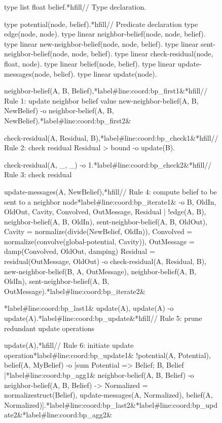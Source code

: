 \begin{figure}[ht]
\begin{LineCode}[commandchars=\*\#\&]
type list float belief.*hfill// Type declaration.

type potential(node, belief).*hfill// Predicate declaration
type edge(node, node).
type linear neighbor-belief(node, node, belief).
type linear new-neighbor-belief(node, node, belief).
type linear sent-neighbor-belief(node, node, belief).
type linear check-residual(node, float, node).
type linear belief(node, belief).
type linear update-messages(node, belief).
type linear update(node).

neighbor-belief(A, B, Belief),*label#line:coord:bp_first1&*hfill// Rule 1: update neighbor belief value
new-neighbor-belief(A, B, NewBelief)
   -o neighbor-belief(A, B, NewBelief).*label#line:coord:bp_first2&

check-residual(A, Residual, B),*label#line:coord:bp_check1&*hfill// Rule 2: check residual
Residual > bound
   -o update(B).

check-residual(A, _, _) -o 1.*label#line:coord:bp_check2&*hfill// Rule 3: check residual

update-messages(A, NewBelief),*hfill// Rule 4: compute belief to be sent to a neighbor node*label#line:coord:bp_iterate1&
   -o {B, OldIn, OldOut, Cavity, Convolved, OutMessage, Residual |
         !edge(A, B),
         neighbor-belief(A, B, OldIn),
         sent-neighbor-belief(A, B, OldOut),
         Cavity = normalize(divide(NewBelief, OldIn)),
         Convolved = normalize(convolve(global-potential, Cavity)),
         OutMessage = damp(Convolved, OldOut, damping)
         Residual = residual(OutMessage, OldOut)
         -o check-residual(A, Residual, B),
            new-neighbor-belief(B, A, OutMessage),
            neighbor-belief(A, B, OldIn),
            sent-neighbor-belief(A, B, OutMessage)}.*label#line:coord:bp_iterate2&

*label#line:coord:bp_last1&
update(A), update(A) -o update(A).*label#line:coord:bp_update&*hfill// Rule 5: prune redundant update operations

update(A),*hfill// Rule 6: initiate update operation*label#line:coord:bp_update1&
!potential(A, Potential),
belief(A, MyBelief)
   -o [sum Potential => Belief; B, Belief |*label#line:coord:bp_agg1&
         neighbor-belief(A, B, Belief) -o
         neighbor-belief(A, B, Belief) ->
         Normalized = normalizestruct(Belief),
         update-messages(A, Normalized), belief(A, Normalized)].*label#line:coord:bp_last2&*label#line:coord:bp_update2&*label#line:coord:bp_agg2&
\end{LineCode}


\label{code:coordination:bp}
\end{figure}

